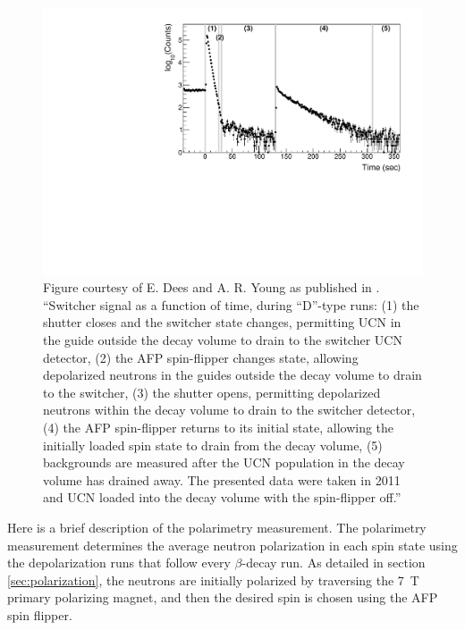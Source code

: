 \begin{figure}[h] 
\centering
\includegraphics[scale=.55]{3-UCNAAnalysis/Switcher_signals.pdf}
\caption{Figure courtesy of E. Dees and A. R. Young as published in \cite{brown2017}.
  ``Switcher signal as a function of time, during ``D''-type runs: (1) the shutter
  closes and the switcher state changes, permitting UCN in the
  guide outside the decay volume to drain to the switcher UCN detector, (2) the AFP
  spin-flipper changes state, allowing depolarized neutrons in the guides outside the
  decay volume to drain to the switcher, (3) the shutter opens, permitting depolarized
  neutrons within the decay volume to drain to the switcher detector, (4) the AFP
  spin-flipper returns to its initial state, allowing the initially loaded spin state
  to drain from the decay volume, (5) backgrounds are measured after the UCN
  population in the decay volume has drained away.  The presented data were taken in 2011
  and UCN loaded into the decay volume with the spin-flipper off.''}
\label{fig:switcherSignal}
\end{figure}

Here is a brief description of the polarimetry measurement.
The polarimetry measurement determines the average neutron polarization in each spin state using
the depolarization runs that follow every $\beta$-decay run. As detailed in section
\ref{sec:polarization}, the neutrons are initially polarized by traversing the 7~T primary
polarizing magnet, and then the desired spin is chosen using the AFP spin flipper.

